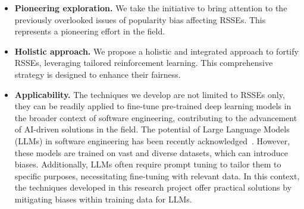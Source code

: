 \begin{itemize}
	
	\item \textbf{Pioneering exploration.} We take the initiative to bring attention to the previously overlooked issues of popularity bias affecting RSSEs. This represents a pioneering effort in the field.
	
	\item \textbf{Holistic approach.} We propose a holistic and integrated approach to fortify RSSEs, leveraging tailored reinforcement learning. This comprehensive strategy is designed to enhance their fairness. %
	
	\item \textbf{Applicability.} The techniques we develop are not limited to RSSEs only, they can be readily applied to fine-tune pre-trained deep learning models in the broader context of software engineering, contributing to the advancement of AI-driven solutions in the field. The potential of Large Language Models (LLMs) in software engineering has been recently acknowledged~\cite{10109345}. However, these models are trained on vast and diverse datasets, which can introduce biases. Additionally, LLMs often require prompt tuning to tailor them to specific purposes, necessitating fine-tuning with relevant data. 
	In this context, the techniques developed in this research project offer practical solutions by mitigating biases within training data for LLMs. %
	
\end{itemize}







